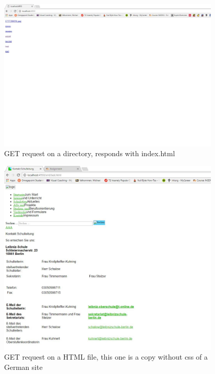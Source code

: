 \documentclass[a4paper,12pt]{article}
\numberwithin{figure}{section}
\begin{document}
\begin{figure}[h!]
	\centering
	\label{Directory}
	\includegraphics[width=0.95\textwidth,keepaspectratio]{img/Directory.jpg} 
	\caption{GET request on a directory, responds with index.html}
\end{figure}

\begin{figure}[hp!]
	\centering
	\label{HTML}
	\includegraphics[width=0.95\textwidth,keepaspectratio]{img/HTMLFile.jpg} 
	\caption{GET request on a HTML file, this one is a copy without css of a German site}
\end{figure}
\end{document}
